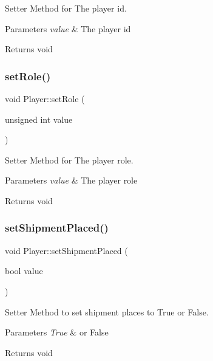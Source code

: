 Setter Method for The player id. 


\begin{DoxyParams}{Parameters}
{\em value} & The player id \\
\hline
\end{DoxyParams}
\begin{DoxyReturn}{Returns}
void 
\end{DoxyReturn}
\mbox{\label{classPlayer_a008b3feee7ca705d7637cc3fbe5d7c58}} 
\subsubsection{\texorpdfstring{set\+Role()}{setRole()}}
{\footnotesize\ttfamily void Player\+::set\+Role (\begin{DoxyParamCaption}\item[{unsigned int}]{value }\end{DoxyParamCaption})}



Setter Method for The player role. 


\begin{DoxyParams}{Parameters}
{\em value} & The player role \\
\hline
\end{DoxyParams}
\begin{DoxyReturn}{Returns}
void 
\end{DoxyReturn}
\mbox{\label{classPlayer_ae6ff3d0d308302f5fc64071991e3cdda}} 
\subsubsection{\texorpdfstring{set\+Shipment\+Placed()}{setShipmentPlaced()}}
{\footnotesize\ttfamily void Player\+::set\+Shipment\+Placed (\begin{DoxyParamCaption}\item[{bool}]{value }\end{DoxyParamCaption})}



Setter Method to set shipment places to True or False. 


\begin{DoxyParams}{Parameters}
{\em True} & or False \\
\hline
\end{DoxyParams}
\begin{DoxyReturn}{Returns}
void 
\end{DoxyReturn}
\mbox{\label{classPlayer_a6b24d6f3b7d11df39c621a2dfb4d19e4}} 
